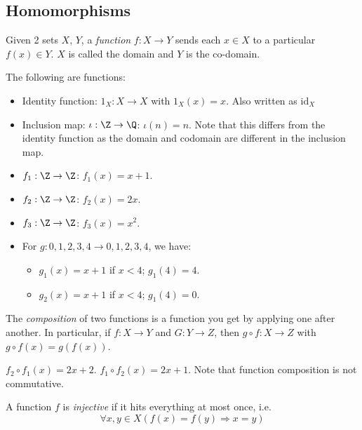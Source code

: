 \documentclass[a4pape]{article}
\begin{document}
\subsection{Homomorphisms}
\begin{defi}[Function]
  Given 2 sets $X$, $Y$, a \emph{function} $f: X \rightarrow Y$ sends each $x\in X$ to a particular $f(x)\in Y$. $X$ is called the domain and $Y$ is the co-domain.
\end{defi}
\begin{eg}
  The following are functions:
  \begin{itemize}
  \item Identity function: $1_X: X \rightarrow X$  with $1_X(x) = x$. Also written as $\mathrm{id}_X$
  \item Inclusion map: $\iota: \Z \rightarrow \Q$: $\iota(n) = n$. Note that this differs from the identity function as the domain and codomain are different in the inclusion map.
  \item $f_1: \Z \rightarrow \Z$: $f_1(x) = x + 1$.
  \item $f_2: \Z \rightarrow \Z$: $f_2(x) = 2x$.
  \item $f_3: \Z \rightarrow \Z$: $f_3(x) = x^2$.
  \item For $g: {0, 1, 2, 3, 4} \rightarrow {0, 1, 2, 3, 4}$, we have:
    \begin{itemize}
    \item $g_1(x) = x + 1$ if $x < 4$; $g_1(4) = 4$.
    \item $g_2(x) = x + 1$ if $x < 4$; $g_1(4) = 0$.
    \end{itemize}
  \end{itemize}
\end{eg}

\begin{defi}
  The \emph{composition} of two functions is a function you get by applying one after another. In particular, if $f: X \rightarrow Y$ and $G: Y\rightarrow Z$, then $g\circ f: X \rightarrow Z$ with $g\circ f(x) = g(f(x))$.
\end{defi}
\begin{eg}
  $f_2\circ f_1(x) = 2x + 2$. $f_1\circ f_2 (x) = 2x + 1$. Note that function composition is not commutative.
\end{eg}
\begin{defi}
  A function $f$ is \emph{injective} if it hits everything at most once, i.e.
  \[
  \forall x, y\in X(f(x) = f(y)\Rightarrow x = y)
  \]
\end{defi}
\end{document}
